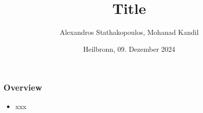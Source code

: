 %
% 
% 
%





\renewcommand{\PersonTitel}{}
\newcommand{\Datum}{\today}

\renewcommand{\PraesentationFusszeileZusatz}{}

\title{Title}
\author{Alexandros Stathakopoulos, Mohanad Kandil}
\institute[]{\UniversitaetName}
\date[\Datum]{Heilbronn, 09. Dezember 2024}
\subject{}




\PraesentationMasterStandard

\PraesentationTitelseite %


\begin{frame}
    \frametitle{Overview}
    \vspace{0.5cm}
	\begin{itemize}
		\item xxx
	\end{itemize}
\end{frame}

